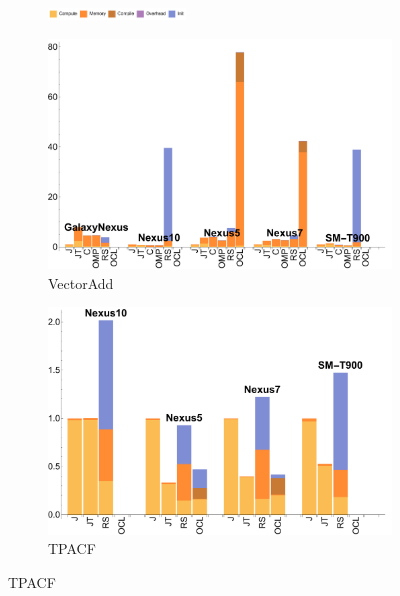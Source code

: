 \begin{figure}[ht]

  \begin{subfigure}[b]{\textwidth}
          \centering
          \includegraphics[width=0.4\textwidth]{data/legend.pdf}
  \end{subfigure}

  \begin{subfigure}[b]{0.5\textwidth}
      \centering
      \includegraphics[width=\textwidth]{data/VectorAdd_onecompute_time.pdf}
      \caption{VectorAdd}\label{fig:vectoradd}
  \end{subfigure}
  \begin{subfigure}[b]{0.5\textwidth}
      \centering
      \includegraphics[width=\textwidth]{data/Tpacf_onecompute_time.pdf}
      \caption{TPACF}
      \label{fig:TPACF}
  \end{subfigure}


\end{figure}
